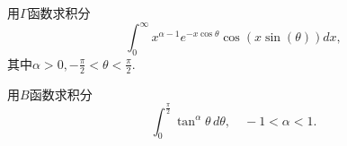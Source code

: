 \documentclass[10pt]{article}
\newenvironment{problem}[2][]{\begin{trivlist}
\item[\hskip \labelsep {\bfseries #1}\hskip \labelsep {\bfseries #2}]}{\end{trivlist}}
\begin{document}
\begin{problem}{7.6}
  用$\Gamma$函数求积分
  $$
  \int_0^\infty x^{\alpha -1 } e^{-x \cos{\theta}} \cos\left( x \sin(\theta) \right) dx,
  $$
  其中$\alpha > 0, -\frac{\pi}{2} < \theta < \frac{\pi}{2}$.
\end{problem} 

\begin{problem}{7.7}
  用$B$函数求积分
  $$
  \int_0^{\frac{\pi}{2}} \tan^\alpha{\theta} \,  d\theta, \quad  -1 < \alpha < 1.
  $$
\end{problem} 
\end{document}
